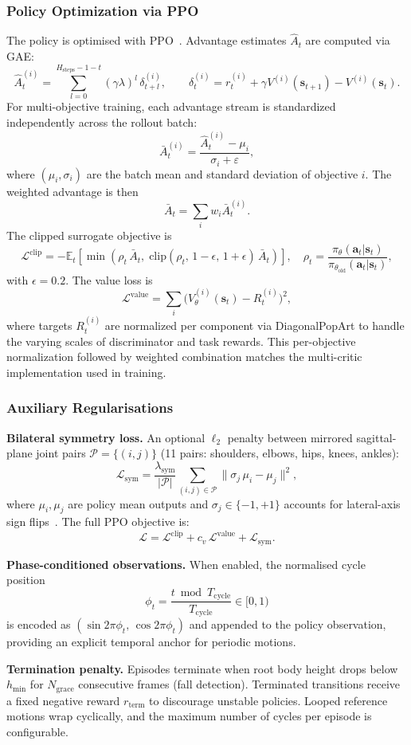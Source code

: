 \subsubsection{Policy Optimization via PPO}
The policy is optimised with PPO~\cite{ppo2017}. Advantage estimates $\hat{A}_t$ are computed via GAE:
\[
    \hat{A}_t^{(i)} = \sum_{l=0}^{H_{\text{steps}}-1-t}(\gamma\lambda)^l\, \delta_{t+l}^{(i)}, \qquad
    \delta_t^{(i)} = r_t^{(i)} + \gamma V^{(i)}(\mathbf{s}_{t+1}) - V^{(i)}(\mathbf{s}_t).
\]
For multi-objective training, each advantage stream is standardized independently across the rollout batch:
\[
    \bar{A}_t^{(i)} = \frac{\hat{A}_t^{(i)} - \mu_i}{\sigma_i + \varepsilon},
\]
where $(\mu_i,\sigma_i)$ are the batch mean and standard deviation of objective $i$. The weighted advantage is then
\[
    \bar{A}_t = \sum_i w_i \bar{A}_t^{(i)}.
\]
The clipped surrogate objective is
\[
    \mathcal{L}^{\text{clip}} = -\mathbb{E}_t\!\left[\min\!\left(\rho_t\,\bar{A}_t,\; \mathrm{clip}(\rho_t,\, 1{-}\epsilon,\, 1{+}\epsilon)\,\bar{A}_t\right)\right],
    \quad \rho_t = \frac{\pi_\theta(\mathbf{a}_t|\mathbf{s}_t)}{\pi_{\theta_{\text{old}}}(\mathbf{a}_t|\mathbf{s}_t)},
\]
with $\epsilon = 0.2$. The value loss is
\[
    \mathcal{L}^{\text{value}} = \sum_i \bigl(V_\theta^{(i)}(\mathbf{s}_t) - R_t^{(i)}\bigr)^2,
\]
where targets $R_t^{(i)}$ are normalized per component via DiagonalPopArt to handle the varying scales of discriminator and task rewards. This per-objective normalization followed by weighted combination matches the multi-critic implementation used in training.

\subsubsection{Auxiliary Regularisations}

\textbf{Bilateral symmetry loss.} An optional $\ell_2$ penalty between mirrored sagittal-plane joint pairs $\mathcal{P} = \{(i,j)\}$ (11 pairs: shoulders, elbows, hips, knees, ankles):
\[
    \mathcal{L}_{\text{sym}} = \frac{\lambda_{\text{sym}}}{|\mathcal{P}|}\sum_{(i,j)\in\mathcal{P}} \|\sigma_j\,\mu_i - \mu_j\|^2,
\]
where $\mu_i,\mu_j$ are policy mean outputs and $\sigma_j \in \{-1,+1\}$ accounts for lateral-axis sign flips~\cite{symlocom2018}. The full PPO objective is:
\[
    \mathcal{L} = \mathcal{L}^{\text{clip}} + c_v\,\mathcal{L}^{\text{value}} + \mathcal{L}_{\text{sym}}.
\]

\textbf{Phase-conditioned observations.} When enabled, the normalised cycle position
\[
    \phi_t = \frac{t \bmod T_{\text{cycle}}}{T_{\text{cycle}}} \in [0,1)
\]
is encoded as $(\sin 2\pi\phi_t,\, \cos 2\pi\phi_t)$ and appended to the policy observation, providing an explicit temporal anchor for periodic motions.

\textbf{Termination penalty.} Episodes terminate when root body height drops below $h_{\min}$ for $N_{\text{grace}}$ consecutive frames (fall detection). Terminated transitions receive a fixed negative reward $r_{\text{term}}$ to discourage unstable policies. Looped reference motions wrap cyclically, and the maximum number of cycles per episode is configurable.
